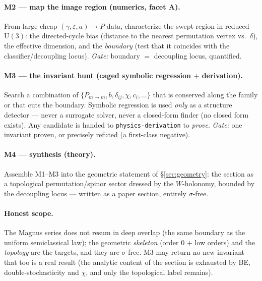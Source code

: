 \documentclass[11pt]{article}
\newcommand{\eps}{\varepsilon}
\newcommand{\U}{\mathrm{U}}
\newcommand{\Pmid}{P_{m\to m}}
\begin{document}
\paragraph{M2 --- map the image region (numerics, facet A).} From large cheap $(\gamma,\eps,a)\to P$ data,
characterize the swept region in reduced-$\U(3)$: the directed-cycle bias (distance to the nearest
permutation vertex vs.\ $\delta$), the effective dimension, and the \emph{boundary} (test that it coincides
with the classifier/decoupling locus). \emph{Gate:} boundary $=$ decoupling locus, quantified.

\paragraph{M3 --- the invariant hunt (caged symbolic regression $+$ derivation).} Search a combination of
$\{\Pmid,b,\delta_{ij},\chi,c_i,\dots\}$ that is conserved along the family or that cuts the boundary.
Symbolic regression is used \emph{only} as a structure detector --- never a surrogate solver, never a
closed-form finder (no closed form exists). Any candidate is handed to \texttt{physics-derivation} to
\emph{prove}. \emph{Gate:} one invariant proven, or precisely refuted (a first-class negative).

\paragraph{M4 --- synthesis (theory).} Assemble M1--M3 into the geometric statement of \S\ref{sec:geometry}:
the section as a topological permutation/spinor sector dressed by the $W$-holonomy, bounded by the
decoupling locus --- written as a paper section, entirely $\sigma$-free.

\paragraph{Honest scope.} The Magnus series does not resum in deep overlap (the same boundary as the
uniform semiclassical law); the geometric \emph{skeleton} (order $0$ $+$ low orders) and the
\emph{topology} are the targets, and they are $\sigma$-free. M3 may return no new invariant --- that too is
a real result (the analytic content of the section is exhausted by BE, double-stochasticity and $\chi$, and
only the topological label remains).
\end{document}
